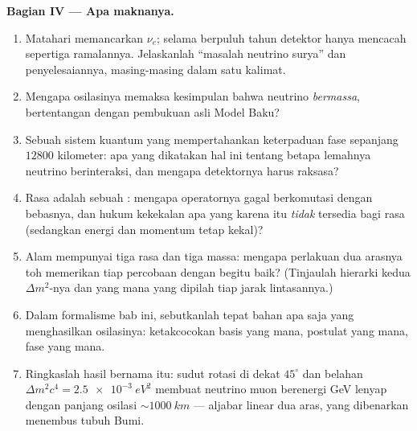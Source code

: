\begin{problem}
\medskip\noindent\textbf{Bagian IV --- Apa maknanya.}
\begin{enumerate}[resume]
  \item Matahari memancarkan $\nu_e$; selama berpuluh tahun detektor
        hanya mencacah sepertiga ramalannya. Jelaskanlah ``masalah
        neutrino surya'' dan penyelesaiannya, masing-masing dalam satu
        kalimat.
  \item Mengapa osilasinya memaksa kesimpulan bahwa neutrino
        \emph{bermassa}, bertentangan dengan pembukuan asli Model Baku?
  \item Sebuah sistem kuantum yang mempertahankan keterpaduan fase
        sepanjang $12800$ kilometer: apa yang dikatakan hal ini tentang
        betapa lemahnya neutrino berinteraksi, dan mengapa detektornya
        harus raksasa?
  \item Rasa adalah sebuah : mengapa operatornya gagal
        berkomutasi dengan  bebasnya, dan hukum kekekalan apa
        yang karena itu \emph{tidak} tersedia bagi rasa (sedangkan energi
        dan momentum tetap kekal)?
  \item Alam mempunyai tiga rasa dan tiga massa: mengapa perlakuan dua
        arasnya toh memerikan tiap percobaan dengan begitu baik?
        (Tinjaulah hierarki kedua $\Delta m^2$-nya dan yang mana yang
        dipilah tiap jarak lintasannya.)
  \item Dalam formalisme bab ini, sebutkanlah tepat bahan apa saja yang
        menghasilkan osilasinya: ketakcocokan basis yang mana, postulat
        yang mana, fase yang mana.
  \item Ringkaslah hasil bernama itu: sudut rotasi di dekat
        $45^\circ$ dan belahan $\Delta m^2c^4 =
        \qty{2.5e-3}{eV^2}$ membuat neutrino muon berenergi GeV lenyap
        dengan panjang osilasi $\sim\qty{1000}{km}$ --- aljabar linear
        dua aras, yang dibenarkan menembus tubuh Bumi.
\end{enumerate}
\end{problem}
